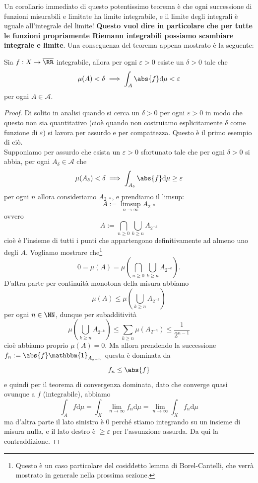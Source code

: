 \documentclass[11pt]{scrartcl}
\newcommand{\dif}{\text{d}}
\begin{document}
	Un corollario immediato di questo potentissimo teorema è che ogni successione di funzioni misurabili e limitate ha limite integrabile, e il limite degli integrali è uguale all'integrale del limite! \textbf{Questo vuol dire in particolare che per tutte le funzioni propriamente Riemann integrabili possiamo scambiare integrale e limite}. Una conseguenza del teorema appena mostrato è la seguente:
	\begin{proposition}
		Sia $f:X\to\overline{\RR}$ integrabile, allora per ogni $\varepsilon>0$ esiste un $\delta>0$ tale che
		$$\mu(A)<\delta \implies\int_A\abs{f}\dif \mu < \varepsilon$$
		per ogni $A\in \mathcal{A}$.
	\end{proposition}
	\begin{proof}
		Di solito in analisi quando si cerca un $\delta>0$ per ogni $\varepsilon>0$ in modo che questo non sia quantitativo (cioè quando non costruiamo esplicitamente $\delta$ come funzione di $\varepsilon$)  si lavora per assurdo e per compattezza. Questo è il primo esempio di ciò. \\
		Supponiamo per assurdo che esista un $\varepsilon>0$ sfortunato tale che per ogni $\delta>0$ si abbia, per ogni $A_\delta\in \mathcal{A}$ che
		$$\mu(A_\delta)<\delta \implies \int_{A_\delta} \abs{f}\dif \mu \ge \varepsilon$$
		per ogni $n$ allora consideriamo $A_{2^{-n}}$, e prendiamo il limsup:
		$$A:=\limsup_{n\to\infty}A_{2^{-n}}$$
		ovvero
		$$A:=\bigcap_{n\ge 0}\bigcup_{k\ge n}A_{2^{-k}}$$
		cioè è l'insieme di tutti i punti che appartengono definitivamente ad almeno uno degli $A$. Vogliamo mostrare che\footnote{Questo è un caso particolare del cosiddetto lemma di Borel-Cantelli, che verrà mostrato in generale nella prossima sezione.}
		$$0=\mu(A)=\mu\left(\bigcap_{n\ge 0}\bigcup_{k\ge n}A_{2^{-k}} \right).$$
		D'altra parte per continuità monotona della misura abbiamo
		$$\mu(A)\le \mu\left(\bigcup_{k\ge n}A_{2^{-k}}\right)$$
		per ogni $n\in\NN$, dunque per subadditività
		$$\mu\left(\bigcup_{k\ge n}A_{2^{-k}}\right)\le \sum_{k\ge n}\mu\left(A_{2^{-n}}\right)\le\frac{1}{2^{n-1}}$$
		cioè abbiamo proprio $\mu(A)=0$.
		Ma allora prendendo la successione $f_n:=\abs{f}\mathbbm{1}_{A_{2^{-n}}}$ questa è dominata da
		$$f_n\le \abs{f}$$
		e quindi per il teorema di convergenza dominata, dato che converge quasi ovunque a $f$ (integrabile), abbiamo
		$$\int_A f\dif \mu =\int_X\lim_{n\to\infty}f_n\dif \mu= \lim_{n\to\infty}\int_X f_n \dif \mu$$
		ma d'altra parte il lato sinistro è $0$ perché stiamo integrando su un insieme di misura nulla, e il lato destro è $\ge \varepsilon$ per l'assunzione assurda. Da qui la contraddizione.
	\end{proof} 
\end{document}
